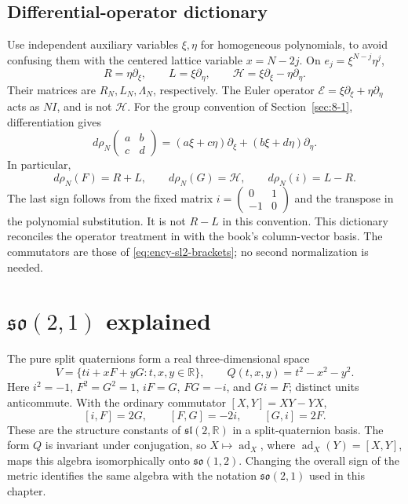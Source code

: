 \subsection{Differential-operator dictionary}
\label{sec:differential-sl2-dictionary}
Use independent auxiliary variables $\xi,\eta$ for homogeneous
polynomials, to avoid confusing them with the centered lattice variable
$x=N-2j$. On $e_j=\xi^{N-j}\eta^j$,
\[
R=\eta\partial_\xi,\qquad L=\xi\partial_\eta,\qquad
\mathcal H=\xi\partial_\xi-\eta\partial_\eta.
\]
Their matrices are $R_N,L_N,\Lambda_N$, respectively. The Euler operator
$\mathcal E=\xi\partial_\xi+\eta\partial_\eta$ acts as $NI$, and is
not $\mathcal H$.
For the group convention of Section~\ref{sec:8-1}, differentiation gives
\[
d\rho_N\!\begin{pmatrix}a&b\\c&d\end{pmatrix}
=(a\xi+c\eta)\partial_\xi+(b\xi+d\eta)\partial_\eta.
\]
In particular,
\[
d\rho_N(F)=R+L,\qquad d\rho_N(G)=\mathcal H,\qquad
d\rho_N(i)=L-R.
\]
The last sign follows from the fixed matrix
$i=\begin{pmatrix}0&1\\-1&0\end{pmatrix}$ and the transpose in the
polynomial substitution. It is not $R-L$ in this convention.
This dictionary reconciles the operator treatment in
\cite[Section~7.4]{KocikFeynman} with the book's column-vector basis.
The commutators are those of \eqref{eq:ency-sl2-brackets}; no second
normalization is needed.

\section{$\mathfrak{so}(2,1)$ explained}
\label{sec:6-1}
The pure split quaternions form a real three-dimensional space
\[
V=\{ti+xF+yG:t,x,y\in\mathbb R\},\qquad Q(t,x,y)=t^2-x^2-y^2.
\]
Here $i^2=-1$, $F^2=G^2=1$, $iF=G$, $FG=-i$, and $Gi=F$;
distinct units anticommute. With the ordinary commutator $[X,Y]=XY-YX$,
\[
[i,F]=2G,\qquad [F,G]=-2i,\qquad [G,i]=2F.
\]
These are the structure constants of $\mathfrak{sl}(2,\mathbb R)$ in a
split-quaternion basis. The form $Q$ is invariant under conjugation, so
$X\mapsto\operatorname{ad}_X$, where $\operatorname{ad}_X(Y)=[X,Y]$,
maps this algebra isomorphically onto $\mathfrak{so}(1,2)$.
Changing the overall sign of the metric identifies the same algebra
with the notation $\mathfrak{so}(2,1)$ used in this chapter.

